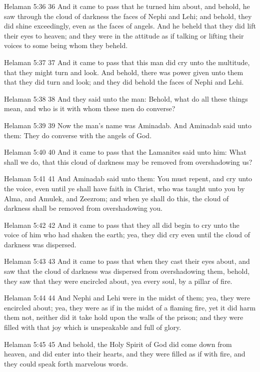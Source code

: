 Helaman 5:36
 36 And it came to pass that he turned him about, and behold, he
saw through the cloud of darkness the faces of Nephi and Lehi;
and behold, they did shine exceedingly, even as the faces of
angels. And he beheld that they did lift their eyes to heaven;
and they were in the attitude as if talking or lifting their
voices to some being whom they beheld.

Helaman 5:37
 37 And it came to pass that this man did cry unto the multitude,
that they might turn and look. And behold, there was power given
unto them that they did turn and look; and they did behold the
faces of Nephi and Lehi.

Helaman 5:38
 38 And they said unto the man: Behold, what do all these things
mean, and who is it with whom these men do converse?

Helaman 5:39
 39 Now the man's name was Aminadab. And Aminadab said unto
them: They do converse with the angels of God.

Helaman 5:40
 40 And it came to pass that the Lamanites said unto him: What
shall we do, that this cloud of darkness may be removed from
overshadowing us?

Helaman 5:41
 41 And Aminadab said unto them: You must repent, and cry unto
the voice, even until ye shall have faith in Christ, who was
taught unto you by Alma, and Amulek, and Zeezrom; and when ye
shall do this, the cloud of darkness shall be removed from
overshadowing you.

Helaman 5:42
 42 And it came to pass that they all did begin to cry unto the
voice of him who had shaken the earth; yea, they did cry even
until the cloud of darkness was dispersed.

Helaman 5:43
 43 And it came to pass that when they cast their eyes about, and
saw that the cloud of darkness was dispersed from overshadowing
them, behold, they saw that they were encircled about, yea every
soul, by a pillar of fire.

Helaman 5:44
 44 And Nephi and Lehi were in the midst of them; yea, they were
encircled about; yea, they were as if in the midst of a flaming
fire, yet it did harm them not, neither did it take hold upon the
walls of the prison; and they were filled with that joy which is
unspeakable and full of glory.

Helaman 5:45
 45 And behold, the Holy Spirit of God did come down from heaven,
and did enter into their hearts, and they were filled as if with
fire, and they could speak forth marvelous words.

